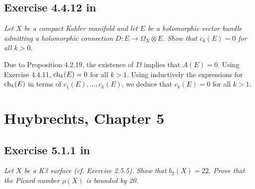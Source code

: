 \documentclass{article}
\begin{document}
\subsection*{Exercise 4.4.12 in \cite{Huy}}
\emph{Let $X$ be a compact Kahler manifold and let $E$ be a holomorphic vector
bundle admitting a holomorphic connection $D : E \to \Omega_X \otimes E$. Show that $c_k(E) = 0$
for all $k > 0$.}
\vspace{3mm}

Due to Proposition 4.2.19, the existence of $D$ implies that $A(E) = 0$. Using Exercise 4.4.11, $\operatorname{ch}_k(E) = 0$ for all
$k>1$. Using inductively the expressions for $\operatorname{ch}_k(E)$ in terms of $c_1(E), \dots, c_k(E)$, we deduce that $c_k(E) = 0$
for all $k>1$.




\section{Huybrechts, Chapter 5}

\subsection*{Exercise 5.1.1 in \cite{Huy}}
\emph{Let $X$ be a K3 surface (cf. Exercise 2.5.5). Show that $b_2(X) = 22$. Prove that the Picard number $\rho(X)$
is bounded by 20.}
\vspace{3mm}
\end{document}
